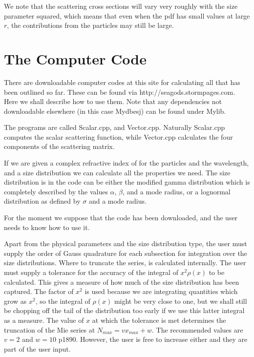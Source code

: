 \begin{flushleft}
We note that the scattering cross sections will vary very roughly with
the size parameter squared, which means that even when the pdf has small
values at large $r$, the contributions from the particles may still be large.

\section{The Computer Code}

There are downloadable computer codes at this site for calculating 
all that has been outlined so far. These can be found via
http://seagods.stormpages.com. Here we shall describe how to
use them. Note that any dependencies not downloadable elsewhere 
(in this case Mydbesj) can be found under Mylib.

The programs are called Scalar.cpp, and Vector.cpp. Naturally Scalar.cpp
computes the scalar scattering function, while Vector.cpp calculates the four
components of the scattering matrix.

If we are given a complex refractive index of for the particles
 and the wavelength, and a size distribution we can calculate 
all the properties we need.
The size distribution is in the code can be either the  modified gamma 
distribution which is
completely described by the values  $\alpha$, $\beta$, and a mode radius, or
a lognormal distribution as defined by $\sigma$ and a mode radius.
 

For the moment we suppose that the code has been downloaded, and
 the user needs
to know how to use it.

Apart from the physical parameters and the size distribution type, the user
must supply the order of Gauss quadrature for each subsection for integration
over the size distributions.
Where to truncate the series, is calculated internally. The user must supply a 
tolerance for the accuracy of the integral of $x^2 \rho(x)$ to be calculated.
This gives a measure of how much of the size distribution has been captured.
The factor of $x^2$ is used because we are integrating quantities which grow as 
$x^2$, so the integral of $\rho(x)$ might be very close to one, but we shall still
be chopping off the tail of the distribution too early if we use this latter 
integral  as a measure. The value of $x$ at which the tolerance is met determines
the truncation of the Mie series at $N_{max}=v x_{max}+w$. The recommended values
are $v=2$ and $w=10$ \cite{Dave1:Mybib} p1890. However, the user is free to increase
 either and they are part of the user input.


\end{flushleft}
